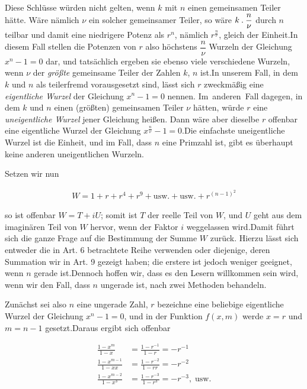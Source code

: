 Diese Schlüsse würden nicht gelten, wenn $k$ mit $n$ einen gemeinsamen Teiler hätte. Wäre nämlich $\nu$ ein solcher gemeinsamer Teiler, so wäre $k\mathbin{.}\dfrac n\nu$ durch $n$ teilbar und damit eine niedrigere Potenz als $r^n$, nämlich $r^{\frac n\nu}$, gleich der Einheit.\quad In diesem Fall stellen die Potenzen von $r$ also höchstens $\dfrac n\nu$ Wurzeln der Gleichung $x^n-1=0$ dar, und tatsächlich ergeben sie ebenso viele verschiedene Wurzeln, wenn $\nu$ der \emph{größte} gemeinsame Teiler der Zahlen
$k$, $n$ ist.\quad In unserem Fall, in dem $k$ und $n$ als teilerfremd vorausgesetzt sind, lässt sich $r$ zweckmäßig eine \emph{eigentliche Wurzel} der Gleichung $x^n-1=0$ nennen. \mbox{Im anderen Fall} dagegen, in dem $k$ und $n$ einen (größten) gemeinsamen Teiler $\nu$ hätten, würde $r$ eine \emph{uneigentliche Wurzel} jener Gleichung heißen. Dann wäre aber dieselbe $r$ offenbar eine eigentliche Wurzel der Gleichung $x^{\frac n\nu}-1=0$.\quad Die einfachste uneigentliche Wurzel ist die Einheit, und im Fall, dass $n$ eine Primzahl ist, gibt es überhaupt keine anderen uneigentlichen Wurzeln.


Setzen wir nun

\[
\begin{aligned}
W=1+r+r^4+r^9+\text{usw.}+\text{usw.}+r^{(n-1)^2}
\end{aligned}
\]

so ist offenbar $W=T+iU$; somit ist $T$ der reelle Teil von $W$, und $U$ geht aus dem imaginären Teil von $W$ hervor, wenn der Faktor $i$ weggelassen wird.\quad Damit führt sich die ganze Frage auf die Bestimmung der Summe $W$ zurück. Hierzu lässt sich entweder die in Art. 6 betrachtete Reihe verwenden oder diejenige, deren Summation wir in Art. 9 gezeigt haben; die erstere ist jedoch weniger geeignet, wenn $n$ gerade ist.\quad Dennoch hoffen wir, dass es den Lesern willkommen sein wird, wenn wir den Fall, dass $n$ ungerade ist, nach zwei Methoden behandeln.

Zunächst sei also $n$ eine ungerade Zahl, $r$ bezeichne eine beliebige eigentliche Wurzel der Gleichung $x^n-1=0$, und in der Funktion $f(x,m)$ werde $x=r$ und $m=n-1$ gesetzt.\quad Daraus ergibt sich offenbar

\[
\begin{aligned}
\frac{1-x^m}{1-x}&=\frac{1-r^{-1}}{1-r}=-r^{-1}\\
\frac{1-x^{m-1}}{1-xx}&=\frac{1-r^{-2}}{1-rr}=-r^{-2}\\
\frac{1-x^{m-2}}{1-x^3}&=\frac{1-r^{-3}}{1-r^3}=-r^{-3},\;\text{usw.}
\end{aligned}
\]

